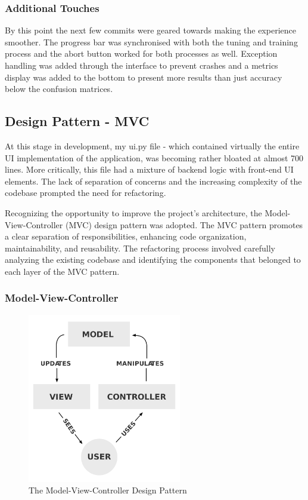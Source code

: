 \documentclass[letterpaper,10pt]{article}
\begin{document}
\subsubsection{Additional Touches}
By this point the next few commits were geared towards making the experience smoother. The progress bar was synchronised with both the tuning and training process and the abort button worked for both processes as well. Exception handling was added through the interface to prevent crashes and a metrics display was added to the bottom to present more results than just accuracy below the confusion matrices. \par

\subsection{Design Pattern - MVC}
At this stage in development, my ui.py file - which contained virtually the entire UI implementation of the application, was becoming rather bloated at almost 700 lines. More critically, this file had a mixture of backend logic with front-end UI elements. The lack of separation of concerns and the increasing complexity of the codebase prompted the need for refactoring. \par

Recognizing the opportunity to improve the project's architecture, the Model-View-Controller (MVC) design pattern was adopted. The MVC pattern promotes a clear separation of responsibilities, enhancing code organization, maintainability, and reusability. The refactoring process involved carefully analyzing the existing codebase and identifying the components that belonged to each layer of the MVC pattern. \par

\subsubsection{Model-View-Controller}

\begin{figure}[ht]
    \centering
    \includegraphics[width=0.6\textwidth]{MVC.png}
    \caption{The Model-View-Controller Design Pattern}
    \label{MVC}
\end{figure}
\end{document}
